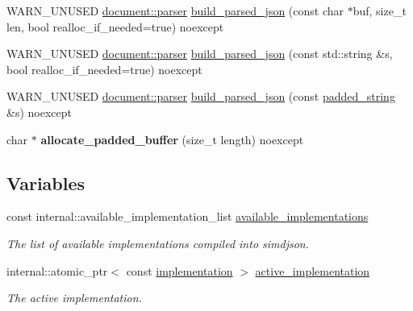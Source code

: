 \begin{DoxyCompactItemize}
\item 
W\+A\+R\+N\+\_\+\+U\+N\+U\+S\+ED \hyperlink{classsimdjson_1_1document_1_1parser}{document\+::parser} \hyperlink{namespacesimdjson_a810c6c6639fd9b8d7f886b2e2529b7e5}{build\+\_\+parsed\+\_\+json} (const char $\ast$buf, size\+\_\+t len, bool realloc\+\_\+if\+\_\+needed=true) noexcept
\item 
W\+A\+R\+N\+\_\+\+U\+N\+U\+S\+ED \hyperlink{classsimdjson_1_1document_1_1parser}{document\+::parser} \hyperlink{namespacesimdjson_a2a86299a7e61f1c5ee295e8f99752653}{build\+\_\+parsed\+\_\+json} (const std\+::string \&s, bool realloc\+\_\+if\+\_\+needed=true) noexcept
\item 
W\+A\+R\+N\+\_\+\+U\+N\+U\+S\+ED \hyperlink{classsimdjson_1_1document_1_1parser}{document\+::parser} \hyperlink{namespacesimdjson_addad9710b2a92f3ecd76bf4e9955fb9d}{build\+\_\+parsed\+\_\+json} (const \hyperlink{structsimdjson_1_1padded__string}{padded\+\_\+string} \&s) noexcept
\item 
\mbox{\label{namespacesimdjson_a811edb19533dc7a8e8d2ab06f6d299f9}} 
char $\ast$ {\bfseries allocate\+\_\+padded\+\_\+buffer} (size\+\_\+t length) noexcept
\end{DoxyCompactItemize}
\subsection*{Variables}
\begin{DoxyCompactItemize}
\item 
\mbox{\label{namespacesimdjson_aadbf671ebebab27680874886a996f63c}} 
const internal\+::available\+\_\+implementation\+\_\+list \hyperlink{namespacesimdjson_aadbf671ebebab27680874886a996f63c}{available\+\_\+implementations}
\begin{DoxyCompactList}\small\item\em The list of available implementations compiled into simdjson. \end{DoxyCompactList}\item 
internal\+::atomic\+\_\+ptr$<$ const \hyperlink{classsimdjson_1_1implementation}{implementation} $>$ \hyperlink{namespacesimdjson_a9ed6efb6da2dda95f75256aaf1d0b9b4}{active\+\_\+implementation}
\begin{DoxyCompactList}\small\item\em The active implementation. \end{DoxyCompactList}\end{DoxyCompactItemize}


